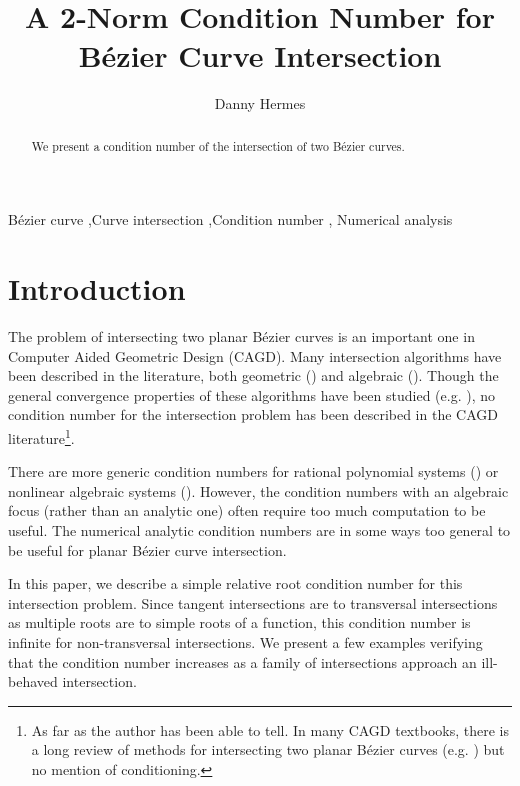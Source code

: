 \documentclass[3p, authoryear, square]{elsarticle}
\theoremstyle{definition}
\begin{document}
\hypersetup{
  urlcolor=MidnightBlue,
  linkcolor=MidnightBlue,
  citecolor=ForestGreen,
}

\begin{frontmatter}

\title{A 2-Norm Condition Number for B\'{e}zier Curve Intersection}
\author[djh]{Danny Hermes}
\address[djh]{UC Berkeley, 970 Evans Hall \#3840, Berkeley, CA 94720-3840 USA}

\begin{abstract}
We present a condition number
of the intersection of two B\'{e}zier curves.
\end{abstract}

\begin{keyword}
B\'{e}zier curve \sep Curve intersection \sep Condition number \sep
Numerical analysis
\end{keyword}

\end{frontmatter}

\section{Introduction}

The problem of intersecting two planar B\'{e}zier curves is an important
one in Computer Aided Geometric Design (CAGD).
Many intersection algorithms have been described in the literature, both
geometric (\cite{Sederberg1986, Sederberg1990, Kim1998}) and algebraic
(\cite{Manocha:CSD-92-698}). Though the general convergence properties
of these algorithms have been studied (e.g. \cite{Schulz2009}),
no condition number for the intersection problem has been described in
the CAGD literature\footnote{As far as the author has been able to tell.
In many CAGD textbooks, there is a long review of methods for intersecting
two planar B\'{e}zier curves (e.g. \cite{Farin2001, SederbergNotes}) but no
mention of conditioning.}.

There are more generic condition numbers for rational polynomial systems
(\cite{Herman2015}) or nonlinear algebraic systems
(\cite[Chapter~25, Section 25.4]{Higham2002}). However, the condition
numbers with an algebraic focus (rather than an analytic one) often
require too much computation to be useful. The numerical analytic condition
numbers are in some ways too general to be useful for planar B\'{e}zier
curve intersection.

In this paper, we describe a simple relative root condition number for this
intersection problem. Since tangent intersections are to transversal
intersections as multiple roots are to simple roots of a function, this
condition number is infinite for non-transversal intersections.
We present a few examples verifying that the condition number increases as
a family of intersections approach an ill-behaved intersection.
\end{document}

